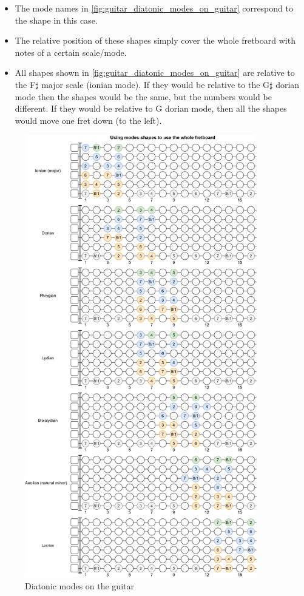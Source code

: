 \infobox
{
	\begin{itemize}
		\item The mode names in \autoref{fig:guitar_diatonic_modes_on_guitar} correspond to the shape in this case.
		\item The relative position of these shapes simply cover the whole fretboard with notes of a certain scale/mode.
		\item All shapes shown in \autoref{fig:guitar_diatonic_modes_on_guitar} are relative to the F$\sharp$ major scale (ionian mode). If they would be relative to the G$\sharp$ dorian mode then the shapes would be the same, but the numbers would be different. If they would be relative to G dorian mode, then all the shapes would move one fret down (to the left). 
	\end{itemize}
}

\newpage

\begin{figure}[h]
	\centering
	\includegraphics[width=0.9\textwidth]{../../Images/guitar_mode_all.png}
	\caption{Diatonic modes on the guitar}
	\label{fig:guitar_diatonic_modes_on_guitar}
\end{figure}

